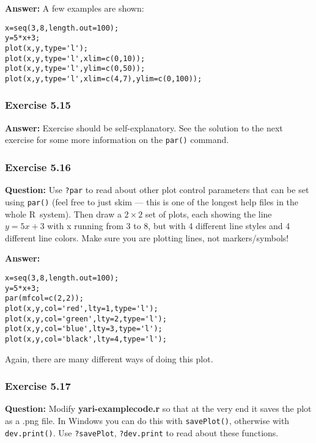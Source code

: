 \documentclass [11pt]{article}
\newcommand{\code}[1]{{\tt #1}}
\newcommand\R{{\sf R}}
\begin{document}
\textbf{Answer:} A few examples are shown:
\begin{verbatim}
x=seq(3,8,length.out=100);
y=5*x+3;
plot(x,y,type='l');
plot(x,y,type='l',xlim=c(0,10));
plot(x,y,type='l',ylim=c(0,50));
plot(x,y,type='l',xlim=c(4,7),ylim=c(0,100));
\end{verbatim}

\subsubsection*{Exercise 5.15}
\textbf{Answer:} Exercise should be self-explanatory. See the solution to the next exercise for some more information on the \code{par()} command.

\subsubsection*{Exercise 5.16}
\textbf{Question:}
Use \code{?par} to read about other plot control parameters
that can be set using \code{par()} (feel free to just skim --- this is one of the
longest help files in the whole \R\ system). Then draw a $2 \times 2$ set of plots,
each showing the line $y=5x+3$ with x running from 3 to 8, but with 4 different
line styles and 4 different line colors. Make sure you are plotting lines, not markers/symbols!

\textbf{Answer:}
\begin{verbatim}
x=seq(3,8,length.out=100);
y=5*x+3;
par(mfcol=c(2,2));
plot(x,y,col='red',lty=1,type='l');
plot(x,y,col='green',lty=2,type='l');
plot(x,y,col='blue',lty=3,type='l');
plot(x,y,col='black',lty=4,type='l');
\end{verbatim}
Again, there are many different ways of doing this plot.

\subsubsection*{Exercise 5.17}
\textbf{Question:} Modify \textbf{yari-examplecode.r} so that at the very end it saves the plot as a .png file. In Windows you can do
this with \code{savePlot()}, otherwise with \code{dev.print()}. Use \code{?savePlot}, \code{?dev.print} to read about these functions.  
\end{document}

